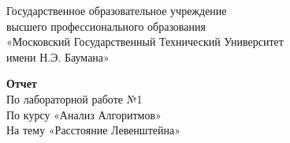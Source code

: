 \begin{titlepage}
	
	\thispagestyle{empty}
	
	\begin{figure}[t]
	\end{figure}
	\begin{center}
	Государственное образовательное учреждение\\
	высшего профессионального образования\\
 	«Московский Государственный Технический Университет\\
 	имени Н.Э. Баумана»
	\end{center}
	
	\vspace{5cm}
	
	\begin{center}
		\textbf {Отчет}\\
		По лабораторной работе №1 \\
		По курсу «Анализ Алгоритмов»\\
		На тему «Расстояние Левенштейна»\\
	\end{center}

	\vspace{10cm}
	

\end{titlepage}